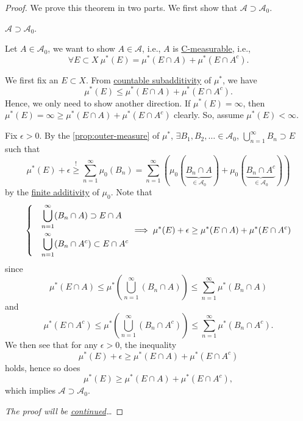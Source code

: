 \begin{proof}\let\qed\relax
	We prove this theorem in two parts. We first show that \(\mathcal{A} \supset \mathcal{A} _0\).
	\begin{claim}
		\(\mathcal{A} \supset \mathcal{A} _0\).
	\end{claim}
	\begin{explanation}
		Let \(A\in \mathcal{A} _0\), we want to show \(A\in \mathcal{A} \), i.e.,
		\(A\) is \hyperref[def:C-measurable]{C-measurable}, i.e.,
		\[
			\forall E\subset X\ \mu^{\ast} (E) = \mu^{\ast} (E\cap A) + \mu^{\ast} (E\cap A^{c}).
		\]

		\par We first fix an \(E\subset X\). From \hyperref[def:outer-measure-countable-subadditivity]{countable subadditivity} of \(\mu^{\ast} \), we have
		\[
			\mu^{\ast} (E) \leq \mu^{\ast} (E\cap A) + \mu^{\ast} (E\cap A^{c} ).
		\]
		Hence, we only need to show another direction. If \(\mu^{\ast} (E) = \infty \), then \(\mu^{\ast} (E) = \infty \geq \mu^{\ast} (E\cap A) + \mu^{\ast} (E\cap A^{c} )\) clearly.
		So, assume \(\mu^{\ast} (E)<\infty \).

		\par Fix \(\epsilon >0\). By the \autoref{prop:outer-measure} of \(\mu^{\ast} \), \(\exists B_1, B_2, \dots \in \mathcal{A}_0\),
		\(\bigcup\limits_{n=1}^{\infty} B_{n}\supset E\) such that
		\[
			\mu^{\ast} (E) + \epsilon \overset{\hyperref[prop:outer-measure]{!}}{\geq} \sum\limits_{n=1}^{\infty} \mu_0(B_{n}) = \sum\limits_{n=1}^{\infty} \left(\mu_0(\underbrace{B_{n}\cap A}_{\in \mathcal{A} _0}) + \mu_0(\underbrace{B_{n}\cap A^{c}}_{\in \mathcal{A} _0} )\right)
		\]
		by the \hyperref[def:pre-measure-finite-additivity]{finite additivity} of \(\mu_0\). Note that
		\[
			\begin{dcases}
				 & \bigcup\limits_{n=1}^{\infty} (B_{n}\cap A)      \supset E\cap A     \\
				 & \bigcup\limits_{n=1}^{\infty} (B_{n}\cap A^{c})  \subset E\cap A^{c}
			\end{dcases}\implies \mu^{\ast} (E)+\epsilon \geq \mu^{\ast} (E\cap A) + \mu^{\ast} (E\cap A^{c} )
		\]
		since
		\[
			\mu^{\ast} (E\cap A)\leq \mu^{\ast} \left(\bigcup\limits_{n=1}^{\infty} (B_{n}\cap A)\right)\leq \sum\limits_{n=1}^{\infty} \mu^{\ast} (B_{n}\cap A)
		\]
		and
		\[
			\mu^{\ast} (E\cap A^{c} )\leq \mu^{\ast} \left(\bigcup\limits_{n=1}^{\infty} (B_{n}\cap A^{c})\right) \leq \sum\limits_{n=1}^{\infty} \mu^{\ast} (B_{n}\cap A^{c} ).
		\]
		We then see that for any \(\epsilon >0\), the inequality
		\[
			\mu^{\ast} (E)+\epsilon \geq \mu^{\ast} (E\cap A) + \mu^{\ast} (E\cap A^{c} )
		\]
		holds, hence so does
		\[
			\mu^{\ast} (E) \geq \mu^{\ast} (E\cap A) + \mu^{\ast} (E\cap A^{c} ),
		\]
		which implies \(\mathcal{A} \supset \mathcal{A} _0\).
	\end{explanation}
	\emph{The proof will be \hyperref[pf:Hahn-Kolmogorov-Thm-cont]{continued}\dots}
\end{proof}